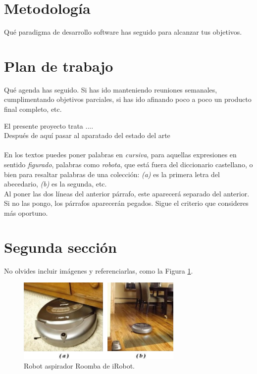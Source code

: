 \section{Metodología}
\label{sec:metodologia}

Qué paradigma de desarrollo software has seguido para alcanzar tus objetivos.

\section{Plan de trabajo}
\label{sec:plantrabajo}

Qué agenda has seguido. Si has ido manteniendo reuniones semanales, cumplimentando objetivos parciales, si has ido afinando poco a poco un producto final completo, etc.




El presente proyecto trata ....\\


Después de aquí pasar al aparatado del estado del arte \\\\

En los textos puedes poner palabras en \textit{cursiva}, para aquellas expresiones en sentido \textit{figurado}, palabras como \textit{robota}, que está fuera del diccionario castellano, o bien para resaltar palabras de una colección: \textit{(a)} es la primera letra del abecedario, \textit{(b)} es la segunda, etc.\\

Al poner las dos líneas del anterior párrafo, este aparecerá separado del anterior. Si no las pongo, los párrafos aparecerán pegados. Sigue el criterio que consideres más oportuno.

\section{Segunda sección}
\label{sec:segundaseccion}

No olvides incluir imágenes y referenciarlas, como la Figura \ref{fig:roomba}.

\begin{figure} [h!]
	\begin{center}
		\includegraphics[width=8cm]{figs/roomba}
	\end{center}
	\caption{Robot aspirador Roomba de iRobot.}
	\label{fig:roomba}
\end{figure}\

